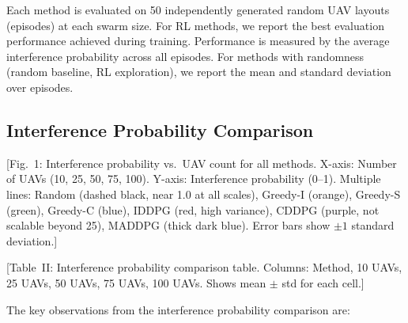 \documentclass[conference]{IEEEtran}
\begin{document}
Each method is evaluated on 50 independently generated random UAV layouts (episodes) at each swarm size. For RL methods, we report the best evaluation performance achieved during training. Performance is measured by the average interference probability across all episodes. For methods with randomness (random baseline, RL exploration), we report the mean and standard deviation over episodes.

\subsection{Interference Probability Comparison}

[Fig.~1: Interference probability vs.\ UAV count for all methods. X-axis: Number of UAVs (10, 25, 50, 75, 100). Y-axis: Interference probability (0--1). Multiple lines: Random (dashed black, near 1.0 at all scales), Greedy-I (orange), Greedy-S (green), Greedy-C (blue), IDDPG (red, high variance), CDDPG (purple, not scalable beyond 25), MADDPG (thick dark blue). Error bars show $\pm 1$ standard deviation.]

[Table~II: Interference probability comparison table. Columns: Method, 10 UAVs, 25 UAVs, 50 UAVs, 75 UAVs, 100 UAVs. Shows mean $\pm$ std for each cell.]

The key observations from the interference probability comparison are:
\end{document}

